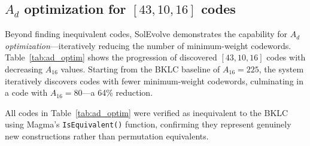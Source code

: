 \subsection{$A_d$ optimization for $[43,10,16]$ codes}
Beyond finding inequivalent codes, SolEvolve demonstrates the capability for \textit{$A_d$ optimization}---iteratively reducing the number of minimum-weight codewords. Table~\ref{tab:ad_optim} shows the progression of discovered $[43,10,16]$ codes with decreasing $A_{16}$ values. Starting from the BKLC baseline of $A_{16} = 225$, the system iteratively discovers codes with fewer minimum-weight codewords, culminating in a code with $A_{16} = 80$---a 64\% reduction.

\begin{table}[h!]
\centering
\caption{$A_d$ optimization for $[43,10,16]$ codes. $A_i$ denotes the count of weight-$i$ codewords; minimizing $A_d$ improves undetected error probability. SolEvolve achieves a 64\% reduction from BKLC.}
\label{tab:ad_optim}
\end{table}

\noindent All codes in Table~\ref{tab:ad_optim} were verified as inequivalent to the BKLC using Magma's \texttt{IsEquivalent()} function, confirming they represent genuinely new constructions rather than permutation equivalents.

